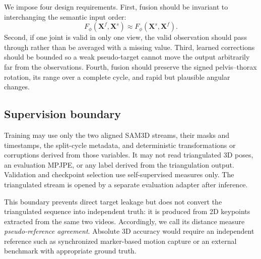 We impose four design requirements. First, fusion should be invariant to
interchanging the semantic input order:
\begin{equation}
 F_{\phi}(\mathbf{X}^{f},\mathbf{X}^{s})
 \approx F_{\phi}(\mathbf{X}^{s},\mathbf{X}^{f}).
 \label{eq:swap}
\end{equation}
Second, if one joint is valid in only one view, the valid observation should pass
through rather than be averaged with a missing value. Third, learned corrections
should be bounded so a weak pseudo-target cannot move the output arbitrarily far
from the observations. Fourth, fusion should preserve the signed pelvis--thorax
rotation, its range over a complete cycle, and rapid but plausible angular
changes.

\subsection{Supervision boundary}

Training may use only the two aligned SAM3D streams, their masks and timestamps,
the split-cycle metadata, and deterministic transformations or corruptions
derived from those variables. It may not read triangulated 3D poses, an
evaluation MPJPE, or any label derived from the triangulation output. Validation
and checkpoint selection use self-supervised measures only. The triangulated
stream is opened by a separate evaluation adapter after inference.

This boundary prevents direct target leakage but does not convert the
triangulated sequence into independent truth: it is produced from 2D keypoints
extracted from the same two videos. Accordingly, we call its distance measure
\emph{pseudo-reference agreement}. Absolute 3D accuracy would require an
independent reference such as synchronized marker-based motion capture or an
external benchmark with appropriate ground truth.


